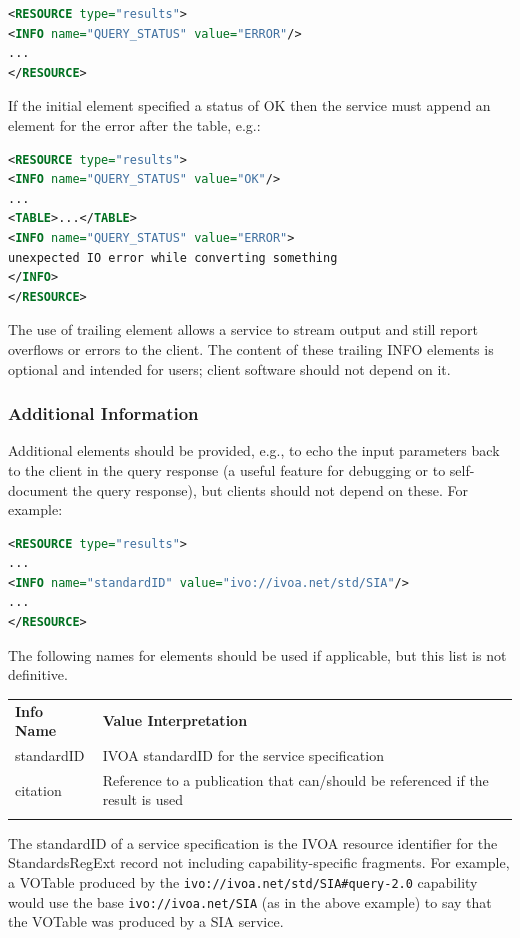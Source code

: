 \documentclass[11pt,letter]{ivoa}
\begin{document}
\begin{lstlisting}[language=XML]
<RESOURCE type="results">
<INFO name="QUERY_STATUS" value="ERROR"/>
...
</RESOURCE>
\end{lstlisting}

If the initial  element specified a status of OK then the service must 
append an  element for the error after the table, e.g.:

\begin{lstlisting}[language=XML]
<RESOURCE type="results">
<INFO name="QUERY_STATUS" value="OK"/>
...
<TABLE>...</TABLE>
<INFO name="QUERY_STATUS" value="ERROR">
unexpected IO error while converting something
</INFO>
</RESOURCE>
\end{lstlisting}

The use of trailing  element allows a service to stream output and still 
report overflows or errors to the client. The content of these trailing INFO 
elements is optional and intended for users; client software should not depend 
on it.

\subsubsection{Additional Information}
Additional  elements should be provided, e.g., to echo the input parameters 
back to the client in the query response (a useful feature for debugging or to 
self-document the query response), but clients should not depend on these. For 
example:

\begin{lstlisting}[language=XML]
<RESOURCE type="results">
...
<INFO name="standardID" value="ivo://ivoa.net/std/SIA"/>
...
</RESOURCE>
\end{lstlisting}

The following names for  elements should be used if applicable, but this 
list is not definitive.

\begin{tabular}{l p{8cm}}
\sptablerule
\textbf{Info Name}&\textbf{Value Interpretation}\\
\sptablerule
standardID & IVOA standardID for the service specification \\
citation & Reference to a publication that can/should be referenced if the 
result is used \\
\sptablerule
\end{tabular}

The standardID of a service specification is the IVOA resource identifier for 
the StandardsRegExt record not including capability-specific fragments. For example, 
a VOTable produced by the \verb|ivo://ivoa.net/std/SIA#query-2.0| capability 
would use the base \verb|ivo://ivoa.net/SIA| (as in the above example) to say that 
the VOTable was produced by a SIA service.
\end{document}
